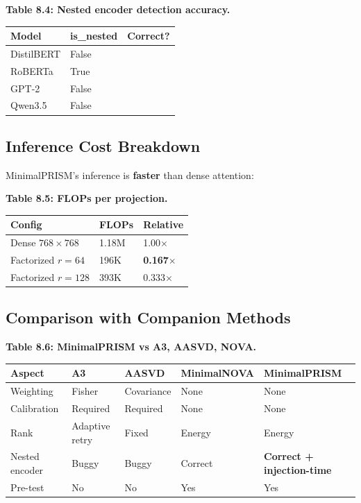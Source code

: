 \textbf{Table 8.4: Nested encoder detection accuracy.}

\begin{table}[H]
\centering
\small
\begin{tabular}{lll}
\toprule
\textbf{Model} & \textbf{is\_nested} & \textbf{Correct?} \\
\midrule
DistilBERT & False &  \\
RoBERTa & True &  \\
GPT-2 & False &  \\
Qwen3.5 & False &  \\
\bottomrule
\end{tabular}
\end{table}

\subsection{Inference Cost Breakdown}

MinimalPRISM's inference is \textbf{faster} than dense attention:

\textbf{Table 8.5: FLOPs per projection.}

\begin{table}[H]
\centering
\small
\begin{tabular}{lll}
\toprule
\textbf{Config} & \textbf{FLOPs} & \textbf{Relative} \\
\midrule
Dense $768 \times 768$ & 1.18M & 1.00$\times$ \\
Factorized $r=64$ & 196K & \textbf{0.167$\times$} \\
Factorized $r=128$ & 393K & 0.333$\times$ \\
\bottomrule
\end{tabular}
\end{table}

\subsection{Comparison with Companion Methods}

\textbf{Table 8.6: MinimalPRISM vs A3, AASVD, NOVA.}

\begin{table}[H]
\centering
\small
\begin{tabular}{lllll}
\toprule
\textbf{Aspect} & \textbf{A3} & \textbf{AASVD} & \textbf{MinimalNOVA} & \textbf{MinimalPRISM} \\
\midrule
Weighting & Fisher & Covariance & None & None \\
Calibration & Required & Required & None & None \\
Rank & Adaptive retry & Fixed & Energy & Energy \\
Nested encoder & Buggy & Buggy & Correct & \textbf{Correct + injection-time} \\
Pre-test & No & No & Yes & Yes \\
\bottomrule
\end{tabular}
\end{table}

